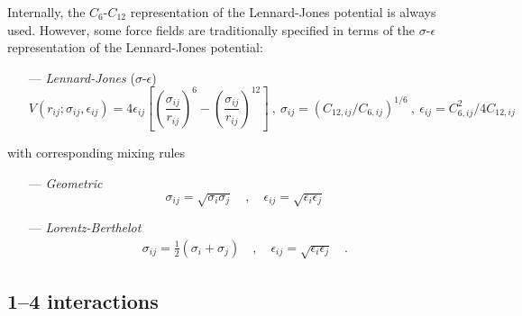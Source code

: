 \documentclass[10pt,a4paper,openany]{memoir}
\numberwithin{equation}{section}
\begin{document}
Internally, the $C_6$-$C_{12}$ representation of the Lennard-Jones
potential is always used.  However, some force fields are
traditionally specified in terms of the $\sigma$-$\epsilon$
representation of the Lennard-Jones potential:
\begin{itemize}
  \item [---] \textit{Lennard-Jones} ($\sigma$-$\epsilon$)
\begin{equation}
  \label{eq:lj-sigma-epsilon-term}
  V(r_{ij}; \sigma_{ij}, \epsilon_{ij}) = 4\epsilon_{ij}\left[ \left(\frac{\sigma_{ij}}{r_{ij}}\right)^{6} - \left(\frac{\sigma_{ij}}{r_{ij}}\right)^{12}   \right] \ , \ \sigma_{ij} = (C_{12,ij}/C_{6,ij})^{1/6} \ , \ \epsilon_{ij} = C_{6,ij}^2/4C_{12,ij}
\end{equation}
\end{itemize}
with corresponding mixing rules
\begin{itemize}
\item [---] \textit{Geometric}
  \begin{equation}
    \label{eq:geometric-mix-sigma-epsilon}
  \sigma_{ij} = \sqrt{\sigma_i \sigma_j} \quad , \quad \epsilon_{ij} = \sqrt{\epsilon_i \epsilon_j}
  \end{equation}
\item [---]\textit{Lorentz-Berthelot}
  \begin{align}
    \label{eq:lorentz-mix-sigma-epsilon}
  \sigma_{ij} = \frac{1}{2}(\sigma_i + \sigma_j) \quad , \quad \epsilon_{ij} = \sqrt{\epsilon_i \epsilon_j} \quad .
  \end{align}
\end{itemize}

\subsection{1--4 interactions}
\label{sec:1-4-interactions}
\end{document}
